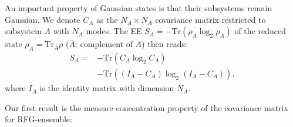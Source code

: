 \documentclass[twocolumn,english,prl,aps,superscriptaddress,amsmath,amssymb,floatfix]{revtex4-2}
\def \Tr {\mathrm{Tr}}
\begin{document}
An important property of Gaussian states is that their subsystems remain %
Gaussian. %
We denote $C_{A}$ as %
the $N_A\times N_A$ covariance matrix restricted
to %
subsystem $A$ with $N_A$ modes. The EE $S_A=-\Tr(\rho_A\log_2\rho_A)$ of the reduced state $\rho_A=\Tr_{\bar A}\rho$ ($\bar A$: complement of $A$) then reads:
\begin{equation}
\begin{split}
    S_{A}=&-\Tr(C_A\log_2 C_A)\\
    &-\Tr((I_A-C_A)\log_2 (I_A-C_A)), %
    \end{split}
    \label{eq:SA}
\end{equation}%
where $I_A$ is the identity matrix with dimension $N_A$.

Our first result is the measure concentration property of the covariance
matrix for RFG-ensemble:
\end{document}
